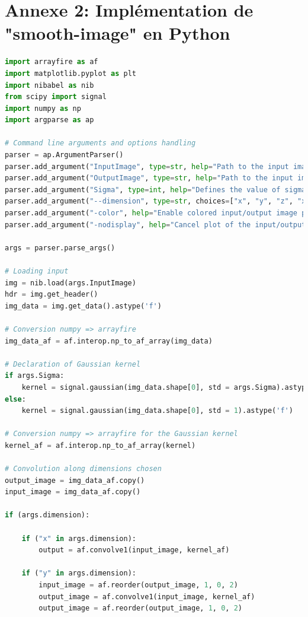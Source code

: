 \documentclass[10pt]{report}
\begin{document}
\begin{appendix}
\begin{lstlisting}[language=C++]
\end{lstlisting}

\chapter*{Annexe 2: Implémentation de "smooth-image" en Python}
\vspace{-1cm}
\begin{lstlisting}[language=python]
import arrayfire as af
import matplotlib.pyplot as plt
import nibabel as nib 
from scipy import signal
import numpy as np
import argparse as ap
	
# Command line arguments and options handling 
parser = ap.ArgumentParser()
parser.add_argument("InputImage", type=str, help="Path to the input image")
parser.add_argument("OutputImage", type=str, help="Path to the input image")
parser.add_argument("Sigma", type=int, help="Defines the value of sigma for the Gaussian kernel. Default: 1")
parser.add_argument("--dimension", type=str, choices=["x", "y", "z", "xy", "yz", "xz", "xyz"], help="Specifies on which dimensions execute the blurring. Default: xyz")
parser.add_argument("-color", help="Enable colored input/output image plot.", action="store_false")
parser.add_argument("-nodisplay", help="Cancel plot of the input/output images. Has priority over \"-color argument\".", action="store_false")

args = parser.parse_args()

# Loading input
img = nib.load(args.InputImage)
hdr = img.get_header()
img_data = img.get_data().astype('f')

# Conversion numpy => arrayfire
img_data_af = af.interop.np_to_af_array(img_data)

# Declaration of Gaussian kernel
if args.Sigma:
	kernel = signal.gaussian(img_data.shape[0], std = args.Sigma).astype('f')
else:
	kernel = signal.gaussian(img_data.shape[0], std = 1).astype('f')

# Conversion numpy => arrayfire for the Gaussian kernel
kernel_af = af.interop.np_to_af_array(kernel)

# Convolution along dimensions chosen 
output_image = img_data_af.copy()
input_image = img_data_af.copy()

if (args.dimension):

	if ("x" in args.dimension):
		output = af.convolve1(input_image, kernel_af)
	
	if ("y" in args.dimension):
		input_image = af.reorder(output_image, 1, 0, 2)
		output_image = af.convolve1(input_image, kernel_af)
		output_image = af.reorder(output_image, 1, 0, 2)
	

\end{lstlisting}
\end{appendix}
\end{document}
